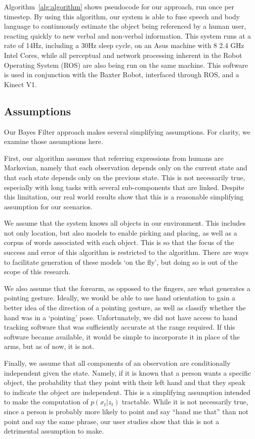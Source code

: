 \documentclass[a4paper, 11pt]{article} %
\begin{document}
Algorithm~\ref{alg:algorithm} shows pseudocode for our approach, run once per timestep. 
By using this algorithm, our system is able to fuse speech and body language to continuously estimate the object being referenced by a human user, reacting quickly to new verbal and non-verbal information. This system runs at a rate of 14Hz, including a 30Hz sleep cycle, on an Asus machine with 8 2.4 GHz Intel Cores, while all perceptual and network processing inherent in the Robot Operating System (ROS) are also being run on the same machine. This software is used in conjunction with the Baxter Robot, interfaced through ROS, and a Kinect V1.
\subsection{Assumptions}
Our Bayes Filter approach makes several simplifying assumptions. For clarity, we examine those assumptions here.

First, our algorithm assumes that referring expressions from humans are Markovian, namely that each observation depends only on the current state and that each state depends only on the previous state. This is not necessarily true, especially with long tasks with several sub-components that are linked. Despite this limitation, our real world results show that this is a reasonable simplifying assumption for our scenarios.

We assume that the system knows all objects in our environment. This includes not only location, but also models to enable picking and placing, as well as a corpus of words associated with each object. This is so that the focus of the success and error of this algorithm is restricted to the algorithm. There are ways to facilitate generation of these models `on the fly', but doing so is out of the scope of this research.

We also assume that the forearm, as opposed to the fingers, are what generates a pointing gesture. Ideally, we would be able to use hand orientation to gain a better idea of the direction of a pointing gesture, as well as classify whether the hand was in a `pointing' pose. Unfortunately, we did not have access to hand tracking software that was sufficiently accurate at the range required. If this software became available, it would be simple to incorporate it in place of the arms, but as of now, it is not.

Finally, we assume that all components of an observation are conditionally independent given the state. Namely, if it is known that a person wants a specific object, the probability that they point with their left hand and that they speak to indicate the object are independent. This is a simplifying assumption intended to make the computation of $p(x_t | z_t)$ tractable. While it is not necessarily true, since a person is probably more likely to point and say ``hand me that'' than not point and say the same phrase, our user studies show that this is not a detrimental assumption to make.
\end{document}

